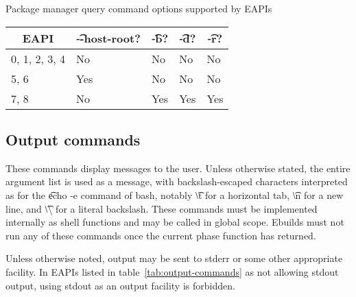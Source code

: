 \begin{centertable}{Package manager query command options supported by EAPIs}
    \label{tab:pm-query-options}
    \begin{tabular}{lllll}
      \toprule
      \multicolumn{1}{c}{\textbf{EAPI}} &
      \multicolumn{1}{c}{\textbf{\t{-{}-host-root}?}} &
      \multicolumn{1}{c}{\textbf{\t{-b}?}} &
      \multicolumn{1}{c}{\textbf{\t{-d}?}} &
      \multicolumn{1}{c}{\textbf{\t{-r}?}} \\
      \midrule
      0, 1, 2, 3, 4     & No  & No  & No  & No  \\
      5, 6              & Yes & No  & No  & No  \\
      7, 8              & No  & Yes & Yes & Yes \\
      \bottomrule
    \end{tabular}
\end{centertable}

\subsection{Output commands}
These commands display messages to the user. Unless otherwise stated, the entire argument list is
used as a message, with backslash-escaped characters interpreted as for the \t{echo -e} command of
bash, notably \t{\textbackslash t} for a horizontal tab, \t{\textbackslash n} for a new line, and
\t{\textbackslash\textbackslash} for a literal backslash. These commands must be implemented
internally as shell functions and may be called in global scope. Ebuilds must not run any of these
commands once the current phase function has returned.

 Unless otherwise noted, output may be sent to stderr or some other
appropriate facility. In EAPIs listed in table~\ref{tab:output-commands} as not allowing stdout
output, using stdout as an output facility is forbidden.

